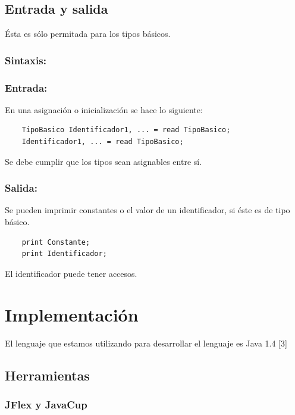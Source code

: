 \documentclass[11pt, spanish]{report}
\begin{document}
\section{Entrada y salida}

\'Esta es s\'olo permitada para los tipos b\'asicos.

\subsection{Sintaxis:}
\subsection{Entrada:}
En una asignaci\'on o inicializaci\'on se hace lo siguiente:
  \begin{verbatim}
    TipoBasico Identificador1, ... = read TipoBasico;
    Identificador1, ... = read TipoBasico;
  \end{verbatim}

Se debe cumplir que los tipos sean asignables entre s\'i.

\subsection{Salida:}
Se pueden imprimir constantes o el valor de un identificador, si \'este es de tipo b\'asico.
  \begin{verbatim}
    print Constante;
    print Identificador;
  \end{verbatim}

El identificador puede tener accesos.

\chapter{Implementaci\'on}
El lenguaje que estamos utilizando para desarrollar el lenguaje es Java 1.4 [3]\\
\section{Herramientas}
\subsection{JFlex y JavaCup}
\end{document}
